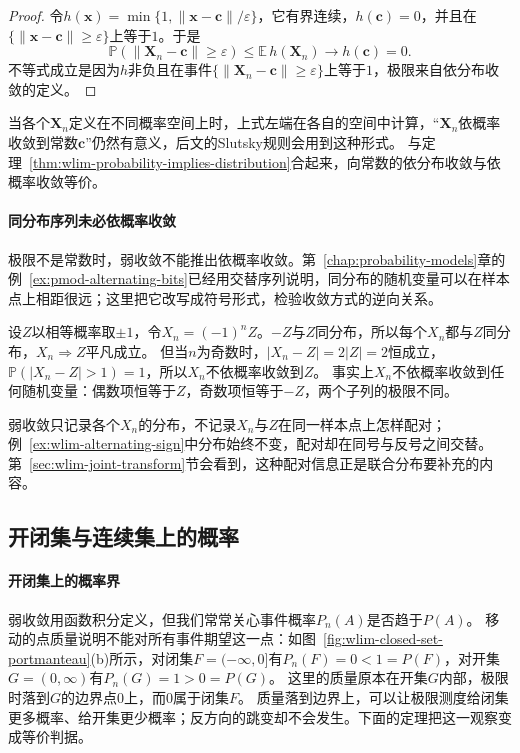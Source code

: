 \begin{proof}
令$h(\bm x)=\min\{1,\lVert\bm x-\bm c\rVert/\varepsilon\}$，它有界连续，$h(\bm c)=0$，并且在$\{\lVert\bm x-\bm c\rVert\geq\varepsilon\}$上等于$1$。于是
\[
  \mathbb P(\lVert\bm X_n-\bm c\rVert\geq\varepsilon)\leq\mathbb E\,h(\bm X_n)\to h(\bm c)=0.
\]
不等式成立是因为$h$非负且在事件$\{\lVert\bm X_n-\bm c\rVert\geq\varepsilon\}$上等于$1$，极限来自依分布收敛的定义。
\end{proof}

当各个$\bm X_n$定义在不同概率空间上时，上式左端在各自的空间中计算，“$\bm X_n$依概率收敛到常数$\bm c$”仍然有意义，后文的Slutsky规则会用到这种形式。
与定理~\ref{thm:wlim-probability-implies-distribution}合起来，向常数的依分布收敛与依概率收敛等价。

\paragraph{同分布序列未必依概率收敛}
极限不是常数时，弱收敛不能推出依概率收敛。第~\ref{chap:probability-models}章的例~\ref{ex:pmod-alternating-bits}已经用交替序列说明，同分布的随机变量可以在样本点上相距很远；这里把它改写成符号形式，检验收敛方式的逆向关系。

\begin{example}[交替符号序列]
\label{ex:wlim-alternating-sign}
设$Z$以相等概率取$\pm1$，令$X_n=(-1)^nZ$。$-Z$与$Z$同分布，所以每个$X_n$都与$Z$同分布，$X_n\Rightarrow Z$平凡成立。
但当$n$为奇数时，$|X_n-Z|=2|Z|=2$恒成立，$\mathbb P(|X_n-Z|>1)=1$，所以$X_n$不依概率收敛到$Z$。
事实上$X_n$不依概率收敛到任何随机变量：偶数项恒等于$Z$，奇数项恒等于$-Z$，两个子列的极限不同。
\end{example}

弱收敛只记录各个$X_n$的分布，不记录$X_n$与$Z$在同一样本点上怎样配对；例~\ref{ex:wlim-alternating-sign}中分布始终不变，配对却在同号与反号之间交替。第~\ref{sec:wlim-joint-transform}节会看到，这种配对信息正是联合分布要补充的内容。

\subsection{开闭集与连续集上的概率}

\paragraph{开闭集上的概率界}
弱收敛用函数积分定义，但我们常常关心事件概率$P_n(A)$是否趋于$P(A)$。
移动的点质量说明不能对所有事件期望这一点：如图~\ref{fig:wlim-closed-set-portmanteau}(b)所示，对闭集$F=(-\infty,0]$有$P_n(F)=0<1=P(F)$，对开集$G=(0,\infty)$有$P_n(G)=1>0=P(G)$。
这里的质量原本在开集$G$内部，极限时落到$G$的边界点$0$上，而$0$属于闭集$F$。
质量落到边界上，可以让极限测度给闭集更多概率、给开集更少概率；反方向的跳变却不会发生。下面的定理把这一观察变成等价判据。

